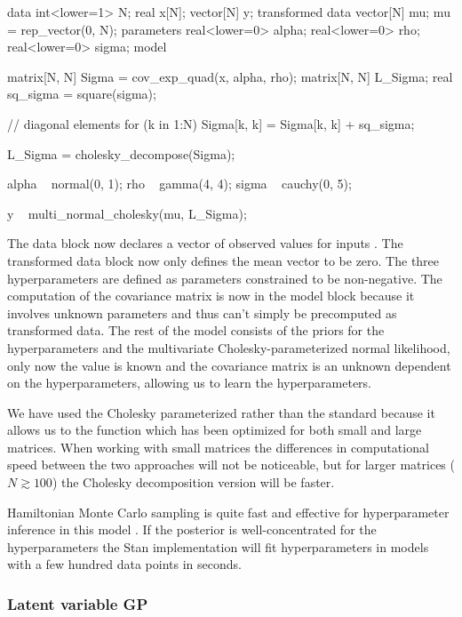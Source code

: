 %
\begin{stancode}
data {
  int<lower=1> N;
  real x[N];
  vector[N] y;
}
transformed data {
  vector[N] mu;
  mu = rep_vector(0, N);
}
parameters {
  real<lower=0> alpha;
  real<lower=0> rho;
  real<lower=0> sigma;
}
model {
  matrix[N, N] Sigma = cov_exp_quad(x, alpha, rho);
  matrix[N, N] L_Sigma;
  real sq_sigma = square(sigma);

  // diagonal elements
  for (k in 1:N)
    Sigma[k, k] = Sigma[k, k] + sq_sigma; 

  L_Sigma = cholesky_decompose(Sigma);

  alpha ~ normal(0, 1);
  rho ~ gamma(4, 4);
  sigma ~ cauchy(0, 5);

  y ~ multi_normal_cholesky(mu, L_Sigma);
}
\end{stancode}
%
The data block now declares a vector  of observed values
 for inputs .  The transformed data block now
only defines the mean vector to be zero.  The three hyperparameters
are defined as parameters constrained to be non-negative.  The
computation of the covariance matrix  is now in the model
block because it involves unknown parameters and thus can't simply be
precomputed as transformed data.  The rest of the model consists of
the priors for the hyperparameters and the multivariate
Cholesky-parameterized normal likelihood, only now the value  is known and the
covariance matrix  is an unknown dependent on the
hyperparameters, allowing us to learn the hyperparameters. 

We have used the Cholesky parameterized  rather than the
standard  because it allows us to the
 function which has been optimized for both small and
large matrices. When working with small matrices the differences in
computational speed between the two approaches will not be noticeable, but for
larger matrices ($N \gtrsim 100$) the Cholesky decomposition version will be faster.

Hamiltonian Monte Carlo sampling is quite fast and effective for
hyperparameter inference in this model \citep{Neal:1997}. If the posterior
is well-concentrated for the hyperparameters the Stan
implementation will fit hyperparameters in models with a few hundred
data points in seconds.

\subsubsection{Latent variable GP}

